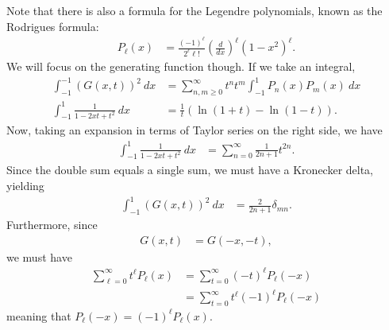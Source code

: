 \documentclass[10pt]{mypackage}
\begin{document}
  Note that there is also a formula for the Legendre polynomials, known as the Rodrigues formula:
  \begin{align*}
    P_{\ell}(x) &= \frac{\left( -1 \right)^{\ell}}{2^{\ell}\ell!} \left( \frac{d}{dx} \right)^{\ell}\left( 1-x^2 \right)^{\ell}.
  \end{align*}
  We will focus on the generating function though. If we take an integral,
  \begin{align*}
    \int_{-1}^{-1} \left( G\left( x,t \right) \right)^2\:dx &= \sum_{n,m\geq 0}^{\infty}t^nt^m \int_{-1}^{1} P_n(x)P_m(x)\:dx\\
    \int_{-1}^{1} \frac{1}{1-2xt + t^2}\:dx &= \frac{1}{t}\left( \ln\left( 1+t \right)-\ln\left( 1-t \right) \right).
  \end{align*}
  Now, taking an expansion in terms of Taylor series on the right side, we have
  \begin{align*}
    \int_{-1}^{1} \frac{1}{1 - 2xt + t^2}\:dx &= \sum_{n=0}^{\infty}\frac{1}{2n+1}t^{2n}.
  \end{align*}
  Since the double sum equals a single sum, we must have a Kronecker delta, yielding
  \begin{align*}
    \int_{-1}^{1} \left( G\left( x,t \right) \right)^2\:dx &= \frac{2}{2n+1}\delta_{mn}.
  \end{align*}
  Furthermore, since
  \begin{align*}
    G\left( x,t \right) &= G\left( -x,-t \right),
  \end{align*}
  we must have
  \begin{align*}
    \sum_{\ell=0}^{\infty}t^{\ell}P_{\ell}\left( x \right) &= \sum_{t=0}^{\infty}\left( -t \right)^{\ell}P_{\ell}\left( -x \right)\\
                                                           &= \sum_{t=0}^{\infty}t^{\ell}\left( -1 \right)^{\ell}P_{\ell}\left( -x \right)
  \end{align*}
  meaning that $P_{\ell}\left( -x \right) = \left( -1 \right)^{\ell}P_{\ell}\left( x \right)$.\newline
\end{document}
